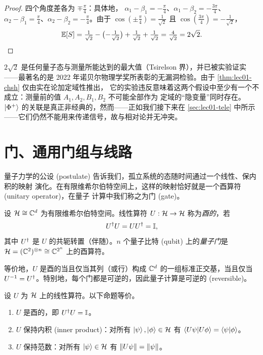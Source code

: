 \begin{proof}
四个角度差各为 $\mp\tfrac{\pi}{4}$：具体地，
$\alpha_1-\beta_1=-\tfrac{\pi}{4}$、$\alpha_1-\beta_2=-\tfrac{3\pi}{4}$、
$\alpha_2-\beta_1=\tfrac{\pi}{4}$、$\alpha_2-\beta_2=-\tfrac{\pi}{4}$。由于
$\cos(\pm\tfrac{\pi}{4})=\tfrac{1}{\sqrt2}$ 且 $\cos(\tfrac{3\pi}{4})=-\tfrac{1}{\sqrt2}$，
\[
  \mathbb{E}[S]=\tfrac{1}{\sqrt2}-\bigl(-\tfrac{1}{\sqrt2}\bigr)+\tfrac{1}{\sqrt2}+\tfrac{1}{\sqrt2}
       =\tfrac{4}{\sqrt2}=2\sqrt2. \qedhere
\]
\end{proof}

\begin{remark}[违反迫使我们放弃什么]
$2\sqrt2$ 是任何量子态与测量所能达到的最大值（Tsirelson 界），并已被实验证实——最著名的是
2022 年诺贝尔物理学奖所表彰的无漏洞检验。由于 \cref{thm:lec01-chsh} 仅由实在论加定域性推出，
它的实验违反意味着这两个假设中至少有一个不成立：测量前的值 $A_1,A_2,B_1,B_2$ 不可能全部作为
定域的“隐变量”同时存在。$\ket{\Phi^{+}}$ 的关联是真正非经典的，然而——正如我们接下来在
\cref{sec:lec01-tele} 中所示——它们仍然不能用来传递信号，故与相对论并无冲突。
\end{remark}
\section{门、通用门组与线路}
\label{sec:lec01-3}

量子力学的公设 (postulate) 告诉我们，孤立系统的态随时间通过一个线性、保内积的映射
演化。在有限维希尔伯特空间上，这样的映射恰好就是一个酉算符 (unitary operator)，在量子
计算中我们称之为门 (gate)。

\begin{definition}\label{def:lec01-unitary}
设 $\mathcal{H}\cong\mathbb{C}^{d}$ 为有限维希尔伯特空间。线性算符
$U:\mathcal{H}\to\mathcal{H}$ 称为\emph{酉的}，若
\[
  U^{\dagger} U = U U^{\dagger} = \mathbb{I},
\]
其中 $U^{\dagger}$ 是 $U$ 的共轭转置（伴随）。$n$ 个量子比特 (qubit) 上的\emph{量子门}是
$\mathcal{H}=(\mathbb{C}^{2})^{\otimes n}\cong\mathbb{C}^{2^{n}}$ 上的酉算符。
\end{definition}

等价地，$U$ 是酉的当且仅当其列（或行）构成 $\mathbb{C}^{d}$ 的一组标准正交基，当且仅当
$U^{-1}=U^{\dagger}$。特别地，每个门都是可逆的，因此量子计算是可逆的 (reversible)。

\begin{theorem}[门保持内积与范数]\label{thm:lec01-unitary-preserves}
设 $U$ 为 $\mathcal{H}$ 上的线性算符。以下命题等价。
\begin{enumerate}[label=\textup{(\roman*)}]
  \item $U$ 是酉的，即 $U^{\dagger} U=\mathbb{I}$。
  \item $U$ 保持内积 (inner product)：对所有 $\ket{\psi},\ket{\phi}\in\mathcal{H}$ 有
        $\braket{U\psi|U\phi}=\braket{\psi|\phi}$。
  \item $U$ 保持范数：对所有 $\ket{\psi}\in\mathcal{H}$ 有 $\left\lVert U\psi \right\rVert=\left\lVert \psi \right\rVert$。
\end{enumerate}
\end{theorem}

